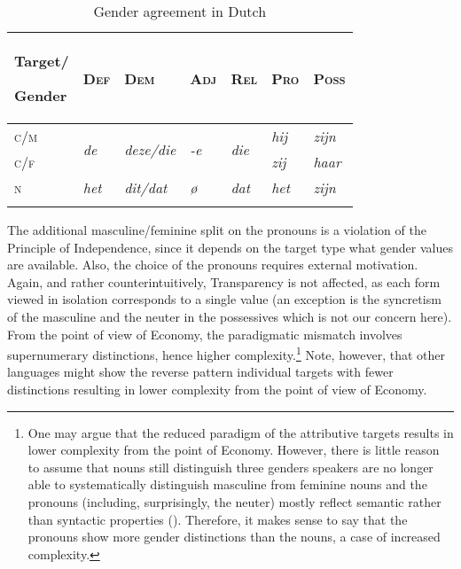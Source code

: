 \documentclass[output=collectionpaper]{langsci/langscibook}
\begin{document}
\begin{table}
\begin{tabularx}{\textwidth}{lXXXXXl}
\lsptoprule
{\bfseries Target/}

\bfseries Gender & \bfseries \textsc{Def} & \bfseries \textsc{Dem} & \bfseries \textsc{Adj} & \bfseries \textsc{Rel} & \bfseries \textsc{Pro} & \bfseries \textsc{Poss}\\
\midrule
\textsc{c/m} & \multirow{2}{*}{\textit{de}} & \multirow{2}{*}{\textit{deze/die}} & \multirow{2}{*}{\textit{{}-e}} & \multirow{2}{*}{\textit{die}} & \textit{hij} & \textit{zijn}\\
\textsc{c/f} &  &  &  &  & \textit{zij} & \textit{haar}\\
\textsc{n} & \textit{het} & \textit{dit/dat} & \textit{ø}\footnotemark{} & \textit{dat} & \textit{het} & \textit{zijn}\\
\lspbottomrule
\end{tabularx}
\caption{Gender agreement in Dutch}
\label{tab:Audr:4}
\end{table}
%

The additional masculine/feminine split on the pronouns is a violation of the Principle of Independence, since it depends on the target type what gender values are available. Also, the choice of the pronouns requires external motivation. Again, and rather counterintuitively, Transparency is not affected, as each form viewed in isolation corresponds to a single value (an exception is the syncretism of the masculine and the neuter in the possessives which is not our concern here). From the point of view of Economy, the paradigmatic mismatch involves supernumerary distinctions, hence higher complexity.\footnote{One may argue that the reduced paradigm of the attributive targets results in lower complexity from the point of Economy. However, there is little reason to assume that  nouns still distinguish three genders \textendash{} speakers are no longer able to systematically distinguish masculine from feminine nouns \textendash{} and the pronouns (including, surprisingly, the neuter) mostly reflect semantic rather than syntactic properties (\citealt{Audring2006,Audring2009}). Therefore, it makes sense to say that the pronouns show more gender distinctions than the nouns, a case of increased complexity.} Note, however, that other languages might show the reverse pattern \textendash{} individual targets with fewer distinctions \textendash{} resulting in lower complexity from the point of view of Economy.
\end{document}
